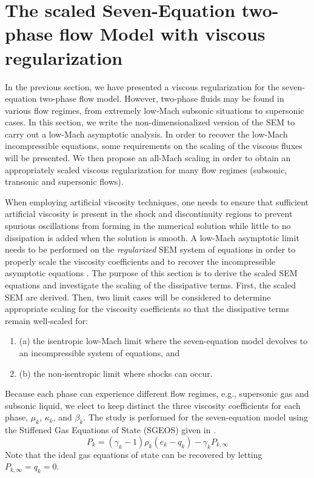 \section{The scaled Seven-Equation two-phase flow Model with viscous regularization}\label{sec:low-Mach}
%
In the previous section, we have presented a viscous regularization for the seven-equation two-phase flow model.  However,
two-phase fluids may be found in various flow regimes, from extremely low-Mach subsonic situations to supersonic cases.
In this section, we write the non-dimensionalized version of the SEM to carry out a low-Mach asymptotic analysis. In order to 
recover the low-Mach incompressible equations, some requirements on the scaling of the viscous fluxes will be presented.  
We then propose an all-Mach scaling in order to obtain an appropriately scaled viscous regularization for many flow regimes
(subsonic, transonic and supersonic flows).

When employing artificial viscosity techniques, one needs to ensure that sufficient artificial viscosity is present in the shock 
and discontinuity regions to prevent spurious oscillations from forming in the numerical solution while little to no dissipation 
is added when the solution is smooth.
A low-Mach asymptotic limit needs to be performed on the {\it regularized} SEM system of equations in order to properly scale the viscosity 
coefficients and to recover the incompressible asymptotic equations \cite{LowMach1,LowMach2,LowMach3}. The purpose of this section is to 
derive the scaled SEM equations and investigate the scaling of the dissipative terms. 
First, the scaled SEM are derived. Then, two limit cases will be considered to determine 
appropriate scaling for the viscosity coefficients so that the dissipative terms remain well-scaled for: 
\begin{enumerate}
\item {(a) the isentropic low-Mach limit where the seven-equation model devolves to an incompressible system of 
equations, and}
\item {(b) the non-isentropic limit where shocks can occur.}
\end{enumerate}
%
Because each phase can experience different flow regimes, e.g., supersonic gas and subsonic liquid, we elect to keep distinct the three viscosity 
coefficients for each phase, $\mu_k$, $\kappa_k$, and $\beta_k$. The study is performed for the seven-equation model using the Stiffened Gas 
Equations of State (SGEOS) \cite{SGEOS} given in .
%
\begin{equation}\label{eq:SGEOS_bis}
P_k = \left( \gamma_k-1 \right) \rho_k( e_k-q_k) - \gamma_k P_{k,\infty}
\end{equation}
Note that the ideal gas equations of state can be recovered by letting $P_{k,\infty}=q_k=0$.


